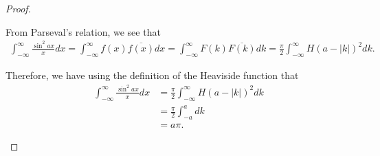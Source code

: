 \begin{proof}
\begin{enumerate}
      From Parseval's relation, we see that
      \begin{align*}
        \int_{-\infty}^\infty \frac{\sin^2 ax}{x}dx
        = \int_{-\infty}^\infty f(x)\overline{f(x)} dx
        = \int_{-\infty}^\infty F(k)\overline{F(k)} dk
        = \frac{\pi}{2}\int_{-\infty}^\infty H(a-|k|)^2 dk.
      \end{align*}

      Therefore, we have using the definition of the Heaviside function that
      \begin{align*}
        \int_{-\infty}^\infty \frac{\sin^2 ax}{x}dx
        &= \frac{\pi}{2}\int_{-\infty}^\infty H(a-|k|)^2 dk \\
        &= \frac{\pi}{2}\int_{-a}^a dk \\
         &= a\pi.
      \end{align*}
  \end{enumerate}
\end{proof}
\newpage
